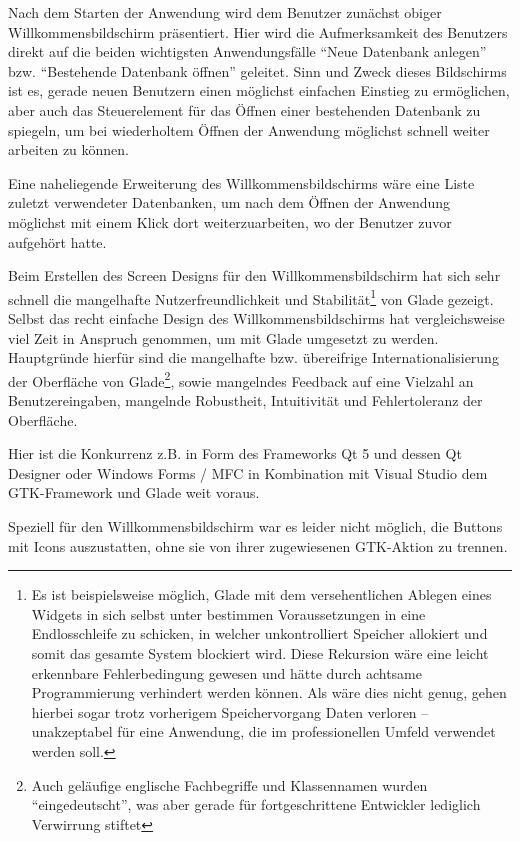 Nach dem Starten der Anwendung wird dem Benutzer zunächst obiger Willkommensbildschirm präsentiert. Hier wird die
Aufmerksamkeit des Benutzers direkt auf die beiden wichtigsten Anwendungsfälle ``Neue Datenbank anlegen'' bzw.
``Bestehende Datenbank öffnen'' geleitet. Sinn und Zweck dieses Bildschirms ist es, gerade neuen Benutzern einen möglichst
einfachen Einstieg zu ermöglichen, aber auch das Steuerelement für das Öffnen einer bestehenden Datenbank zu spiegeln,
um bei wiederholtem Öffnen der Anwendung möglichst schnell weiter arbeiten zu können.

Eine naheliegende Erweiterung des Willkommensbildschirms wäre eine Liste zuletzt verwendeter Datenbanken, um nach dem
Öffnen der Anwendung möglichst mit einem Klick dort weiterzuarbeiten, wo der Benutzer zuvor aufgehört hatte.

Beim Erstellen des Screen Designs für den Willkommensbildschirm hat sich sehr schnell die mangelhafte Nutzerfreundlichkeit
und Stabilität\footnote{Es ist beispielsweise möglich, Glade mit dem versehentlichen Ablegen eines Widgets in sich
selbst unter bestimmen Voraussetzungen in eine Endlosschleife zu schicken, in welcher unkontrolliert Speicher allokiert
und somit das gesamte System blockiert wird. Diese Rekursion wäre eine leicht erkennbare Fehlerbedingung gewesen und hätte
durch achtsame Programmierung verhindert werden können. Als wäre dies nicht genug, gehen hierbei sogar trotz vorherigem
Speichervorgang Daten verloren -- unakzeptabel für eine Anwendung, die im professionellen Umfeld verwendet werden soll.}
von Glade gezeigt. Selbst das recht einfache Design des Willkommensbildschirms hat vergleichsweise viel
Zeit in Anspruch genommen, um mit Glade umgesetzt zu werden.
Hauptgründe hierfür sind die mangelhafte bzw. übereifrige Internationalisierung der Oberfläche von Glade\footnote{Auch geläufige
englische Fachbegriffe und Klassennamen wurden ``eingedeutscht'', was aber gerade für fortgeschrittene Entwickler
lediglich Verwirrung stiftet}, sowie mangelndes Feedback auf eine Vielzahl an Benutzereingaben, mangelnde Robustheit,
Intuitivität und Fehlertoleranz der Oberfläche.

Hier ist die Konkurrenz z.B. in Form des Frameworks Qt 5 und dessen Qt Designer oder Windows Forms / MFC in Kombination
mit Visual Studio dem GTK-Framework und Glade weit voraus.

Speziell für den Willkommensbildschirm war es leider nicht möglich, die Buttons mit Icons auszustatten, ohne sie von ihrer
zugewiesenen GTK-Aktion zu trennen.